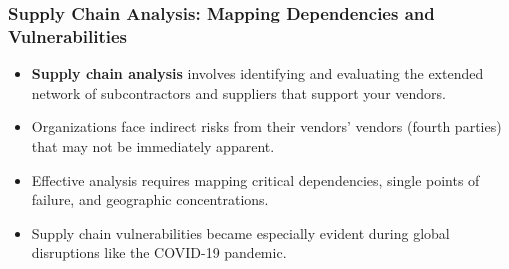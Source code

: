 \documentclass{beamer}
\begin{document}
\begin{frame}
    \frametitle{Supply Chain Analysis: Mapping Dependencies and Vulnerabilities}
    \scriptsize
    \begin{itemize}
        \item \textbf{Supply chain analysis} involves identifying and evaluating the extended network of subcontractors and suppliers that support your vendors.
        \item Organizations face indirect risks from their vendors' vendors (fourth parties) that may not be immediately apparent.
        \item Effective analysis requires mapping critical dependencies, single points of failure, and geographic concentrations.
        \item Supply chain vulnerabilities became especially evident during global disruptions like the COVID-19 pandemic.
    \end{itemize}
    
    \begin{center}
    \end{center}
\end{frame}
\end{document}
